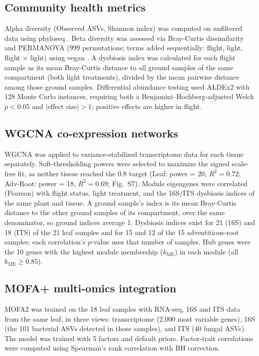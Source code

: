 \documentclass[pdflatex,sn-nature]{sn-jnl}
\begin{document}
\subsection{Community health metrics}
Alpha diversity (Observed ASVs, Shannon index) was computed on unfiltered data using
phyloseq \cite{mcmurdie2013}. Beta diversity was assessed via Bray-Curtis
dissimilarity and PERMANOVA (999 permutations; terms added sequentially: flight, light,
flight \(\times\) light) using vegan \cite{oksanen2026}. A
dysbiosis index was calculated for each flight sample as its mean Bray-Curtis distance
to all ground samples of the same compartment (both light treatments), divided by the
mean pairwise distance among those ground samples. Differential abundance testing used ALDEx2
\cite{fernandes2014} with 128 Monte Carlo instances, requiring both a Benjamini--Hochberg-adjusted Welch \(p < 0.05\) and
\(|\text{effect size}| > 1\); positive effects are higher in flight.

\subsection{WGCNA co-expression networks}
WGCNA \cite{langfelder2008} was applied to variance-stabilized transcriptome data
for each tissue separately. Soft-thresholding powers were selected to maximize
the signed scale-free fit, as neither tissue reached the 0.8 target (Leaf: power = 20,
\(R^2 = 0.72\); Adv-Root: power = 18, \(R^2 = 0.69\); Fig.~S7). Module eigengenes were correlated (Pearson) with flight status, light treatment, and
the 16S/ITS dysbiosis indices of the same plant and tissue. A ground sample's index is its mean
Bray-Curtis distance to the other ground samples of its compartment, over the same denominator,
so ground indices average 1. Dysbiosis indices exist for 21 (16S) and 18 (ITS) of the 21 leaf
samples and for 15 and 12 of the 15 adventitious-root samples; each correlation's \(p\)-value
uses that number of samples. Hub genes were the 10 genes with the highest module membership
(\(k_{\mathrm{ME}}\)) in each module (all \(k_{\mathrm{ME}} \geq 0.85\)).

\subsection{MOFA+ multi-omics integration}
MOFA2 \cite{argelaguet2020} was trained on the 18 leaf samples with RNA-seq, 16S and ITS data
from the same leaf, in three views: transcriptome (2{,}000 most variable genes), 16S (the 101
bacterial ASVs detected in those samples), and ITS (40 fungal ASVs). The model was trained with 5 factors and default priors. Factor-trait
correlations were computed using Spearman's rank correlation with BH correction.
\end{document}
